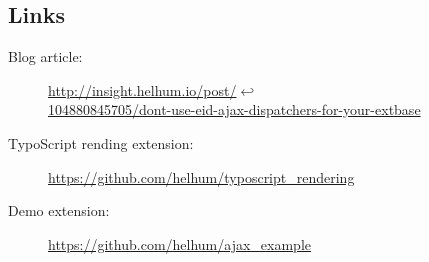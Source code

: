 \subsection{Links}

\begin{description}
  \item[Blog article:] \url{http://insight.helhum.io/post/}$\hookleftarrow$\\ \url{104880845705/dont-use-eid-ajax-dispatchers-for-your-extbase}
  \item[TypoScript rending extension:] \url{https://github.com/helhum/typoscript_rendering}
  \item[Demo extension:] \url{https://github.com/helhum/ajax_example}
\end{description}
